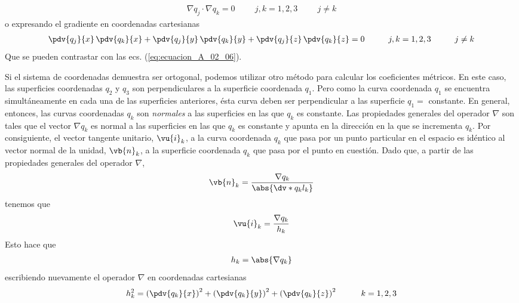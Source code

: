 \begin{align}
\nabla q_{j} \cdot \nabla q_{k} = 0 \hspace{1cm} j, k = 1, 2, 3 \hspace{1cm} j \neq k
\label{eq:ecuacion_A_02_07}    
\end{align}
o expresando el gradiente en coordenadas cartesianas
\begin{align}
\pdv{q_{j}}{x} \, \pdv{q_{k}}{x} + \pdv{q_{j}}{y} \, \pdv{q_{k}}{y} + \pdv{q_{j}}{z} \, \pdv{q_{k}}{z} = 0 \hspace{1cm} j, k = 1, 2, 3 \hspace{1cm} j \neq k
\label{eq:ecuacion_A_02_08}
\end{align}
Que se pueden contrastar con las ecs. (\ref{eq:ecuacion_A_02_06}).
\par
Si el sistema de coordenadas demuestra ser ortogonal, podemos utilizar otro método para calcular los coeficientes métricos. En este caso, las superficies coordenadas $q_{2}$ y $q_{3}$ son perpendiculares a la superficie coordenada $q_{1}$. Pero como la curva coordenada $q_{1}$ se encuentra simultáneamente en cada una de las superficies anteriores, ésta curva deben ser perpendicular a las superficie $q_{1} =$ constante. En general, entonces, las curvas coordenadas $q_{k}$ son \emph{normales} a las superficies en las que $q_{k}$ es constante. Las propiedades generales del operador $\nabla$ son tales que el vector $\nabla q_{k}$ es normal a las superficies en las que $q_{k}$ es constante y apunta en la dirección en la que se incrementa $q_{k}$. Por consiguiente, el vector tangente unitario, $\vu{i}_{k}$, a la curva coordenada $q_{k}$ que pasa por un punto particular en el espacio es idéntico al vector normal de la unidad, $\vb{n}_{k}$, a la superficie coordenada $q_{k}$ que pasa por el punto en cuestión. Dado que, a partir de las propiedades generales del operador $\nabla$,
\begin{align*}
\vb{n}_{k} = \dfrac{\nabla q_{k}}{\abs{\dv*{q_{k}}{l_{k}}}}
\end{align*}
tenemos que
\begin{align}
\vu{i}_{k} = \dfrac{\nabla q_{k}}{h_{k}}
\label{eq:ecuacion_A_02_09}
\end{align}
Esto hace que
\begin{align}
h_{k} = \abs{\nabla q_{k}}
\label{ec:ecuacion_A_02_10}
\end{align}
escribiendo nuevamente el operador $\nabla$ en coordenadas cartesianas
\begin{align}
h_{k}^{2} = \left( \pdv{q_{k}}{x} \right)^{2} + \left( \pdv{q_{k}}{y} \right)^{2} + \left( \pdv{q_{k}}{z} \right)^{2} \hspace{1cm} k = 1, 2, 3
\label{eq:ecuacion_A_02_11}
\end{align}
